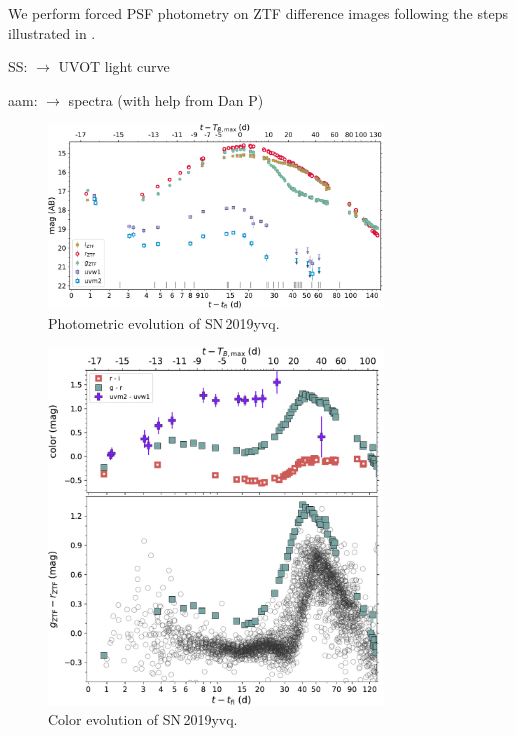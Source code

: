 \documentclass[twocolumn]{aastex63}
\newcommand{\steve}[1]{{\color{purple} SS: {#1}}}
\newcommand{\aam}[1]{{\color{DarkOrange} aam: {#1}}}
\newcommand{\sn}{SN\,2019yvq}
\begin{document}
We perform forced PSF photometry on ZTF difference images following the steps illustrated in  \citet{Yao19}. 

\steve{$\longrightarrow$ UVOT light curve}

\aam{$\longrightarrow$ spectra (with help from Dan P)}

\begin{figure}
    \centering
    \includegraphics[width=3.5in]{./figures/P48_lc.pdf}
    \caption{Photometric evolution of \sn.}
    \label{fig:p48}
\end{figure}

\begin{figure}
    \centering
    \includegraphics[width=3.5in]{./figures/P48_colors.pdf}
    \caption{Color evolution of \sn.}
    \label{fig:p48}
\end{figure}
\end{document}

